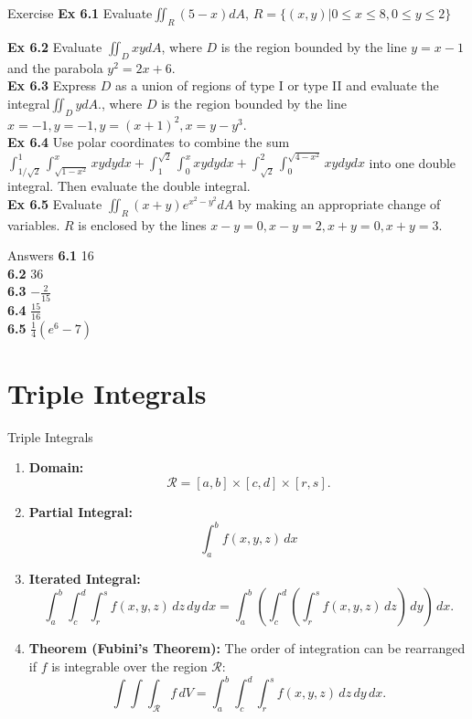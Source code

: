 \documentclass[aspectratio=169, UTF8]{ctexbeamer}
\begin{document}
\begin{frame}{Exercise}
    \textbf{Ex 6.1 }Evaluate$\iint_R(5-x)dA$, $R=\{(x,y)|0\leq x
    \leq 8,0\leq y\leq2\}$\\
    \par
    \textbf{Ex 6.2 }Evaluate $\iint_DxydA$, where $D$ is the region bounded by the line $y=x-1$ and the parabola $y^2=2x+6$.\\
    \textbf{Ex 6.3 }Express $D$ as a union of regions of type I or type II and evaluate the integral$\iint_D ydA$., where $D$ is the region bounded by the line $x=-1,y=-1,y=(x+1)^2,x=y-y^3$.\\
    \textbf{Ex 6.4} Use polar coordinates to combine the sum
    $\int_{1/\sqrt{2}}^1\int_{\sqrt{1-x^2}}^xxydydx+\int_1^{\sqrt{2}}\int_0^xxydydx+\int_{\sqrt{2}}^2\int_0^{\sqrt{4-x^2}}xydydx$ into one double integral. Then evaluate the double integral.\\
    \textbf{Ex 6.5} Evaluate $\iint_R(x+y)e^{x^2-y^2}dA$ by making an appropriate change of variables. $R$ is enclosed by the lines $x-y=0,x-y=2,x+y=0,x+y=3$.
\end{frame}
\begin{frame}{Answers}
    \textbf{6.1} 16\\
    \textbf{6.2} 36\\
    \textbf{6.3} $-\frac{2}{15}$\\
    \textbf{6.4} $\frac{15}{16}$\\
    \textbf{6.5} $\frac{1}{4}(e^6-7)$
\end{frame}


\section{Triple Integrals}
\begin{frame}[label=2]{Triple Integrals}
    \begin{enumerate}
  \item \textbf{Domain:}
  $$\mathcal{R} = [a, b] \times [c, d] \times [r,s].$$

  \item \textbf{Partial Integral:}
  $$\int_a^b f(x, y, z) \, dx$$

  \item \textbf{Iterated Integral:}
  $$\int_a^b \int_c^d \int_r^s f(x, y, z) \, dz \, dy \, dx = \int_a^b \left(\int_c^d \left(\int_r^s f(x, y, z) \, dz\right) \, dy\right) \, dx.$$

  \item \textbf{Theorem (Fubini’s Theorem):} The order of integration can be rearranged if $f$ is integrable over the region $\mathcal{R}$:
  $$\int \int \int_{\mathcal{R}} f \, dV = \int_a^b \int_c^d \int_r^s f(x, y, z) \, dz \, dy \, dx.$$

\end{enumerate}

\end{frame}
\end{document}
